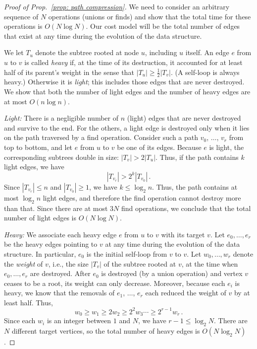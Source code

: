 \documentclass{tstextbook}
\begin{document}
\begin{proof}[Proof of Prop.~\ref{prop: path compression}]
  We need to consider an arbitrary sequence of $N$ operations (unions or finds) and show that the total time for these operations is $O(N\log N)$.
  Our cost model will be the total number of edges that exist at any time during the evolution of the data structure.

  We let $T_u$ denote the subtree rooted at node $u$, including $u$ itself.
  An edge $e$ from $u$ to $v$ is called \emph{heavy} if, at the time of its destruction, it accounted for at least half of its parent's weight in the sense that $|T_u| \geq \frac12|T_v|$.
  (A self-loop is always heavy.)
  Otherwise it is \emph{light}; this includes those edges that are never destroyed.
  We show that both the number of light edges and the number of heavy edges are at most $O(n\log n)$.

  \emph{Light:}
  There is a negligible number of $n$ (light) edges that are never destroyed and survive to the end.
  For the others, a light edge is destroyed only when it lies on the path traversed by a find operation.
  Consider such a path $v_0$, $\ldots$, $v_r$ from top to bottom, and let $e$ from $u$ to $v$ be one of its edges. 
  Because $e$ is light, the corresponding subtrees double in size: $|T_v|> 2|T_u|$.
  Thus, if the path contains $k$ light edges, we have \[|T_{v_r}| > 2^k |T_{v_0}|\,.\]
  Since $|T_{v_r}|\leq n$ and $|T_{v_0}| \geq 1$, we have $k\leq\log_2 n$.
  Thus, the path contains at most $\log_2 n$ light edges, and therefore the find operation cannot destroy more than that.
  Since there are at most $3N$ find operations, we conclude that the total number of light edges is $O(N\log N)$.
 
  \emph{Heavy:}
  We associate each heavy edge $e$ from $u$ to $v$ with its target $v$.
  Let $e_0,\ldots, e_r$ be the heavy edges pointing to $v$ at any time during the evolution of the data structure.
  In particular, $e_0$ is the initial self-loop from $v$ to $v$.
  Let $w_0,\ldots, w_r$ denote the \emph{weight} of $v$, i.e., the size $|T_v|$ of the subtree rooted at $v$, at the time when $e_0,\ldots, e_r$ are destroyed.
  After $e_0$ is destroyed (by a union operation) and vertex $v$ ceases to be a root, its weight can only decrease.
  Moreover, because each $e_i$ is heavy, we know that the removals of $e_1$, $\ldots$, $e_r$ each reduced the weight of $v$ by at least half.
  Thus, 
  \[ w_0\geq w_1\geq 2 w_2 \geq 2^2w_3\cdots\geq 2^{r-1} w_r\,.\]
  Since each $w_i$ is an integer between $1$ and $N$, we have $r - 1\leq \log_2 N$.
  There are $N$ different target vertices, so the total number of heavy edges is $O(N\log_2 N)$.
\end{proof}
\end{document}
